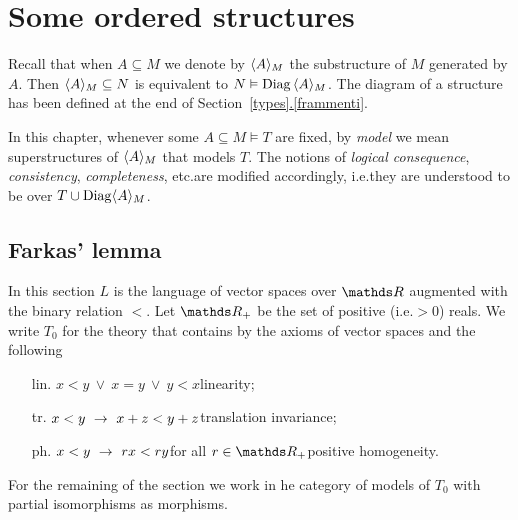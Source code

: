 \documentclass[creche.tex]{subfiles}
\begin{document}
\chapter{Some ordered structures}
\label{saturation}
 
\def\medrel#1{\parbox[t]{5ex}{$\displaystyle\hfil #1$}}
\def\ceq#1#2#3{\parbox{15ex}{$\displaystyle #1$}\medrel{#2}$\displaystyle  #3$}





\begin{notation}\label{notation1}
Recall that when $A\subseteq M$ we denote by \emph{$\langle A\rangle_M$\/} the substructure of $M$ generated by $A$. Then $\langle A\rangle_M\subseteq N$ is equivalent to $N\vDash {\rm Diag}\,\langle A\rangle_M$. The diagram of a structure has been defined at the end of Section~\hyperref[frammenti]{\ref{types}.\ref{frammenti}}.

In this chapter, whenever some $A\subseteq M\models T$ are fixed, by \textit{model\/} we mean superstructures of $\langle A\rangle_M$ that models $T$. The notions of \textit{logical consequence}, \textit{consistency}, \textit{completeness}, etc.\@ are modified accordingly, i.e.\@ they are understood to be over $T\cup{\rm Diag}\langle A\rangle_M$.\QED
\end{notation}



\section{Farkas' lemma}
In this section $L$ is the language of vector spaces over $\RR$ augmented with the binary relation $<$. Let \emph{$\RR_+$\/} be the set of positive (i.e.\@ $>0$) reals. We write \emph{$T_0$\/} for the theory that contains by the axioms of vector spaces and the following

\begin{itemize}
\item[lin.] $x<y\ \vee\ x=y\ \vee\  y<x$\hfill linearity;
\item[tr.] $x<y\ \rightarrow\ x+z < y+z$\hfill translation invariance;
\item[ph.] $x<y\ \rightarrow\ r x < r y$\quad for all $r\in\RR_+$\hfill positive homogeneity.
\end{itemize}
For the remaining of the section we work in he category of models of $T_0$ with partial isomorphisms as morphisms. 
\end{document}
